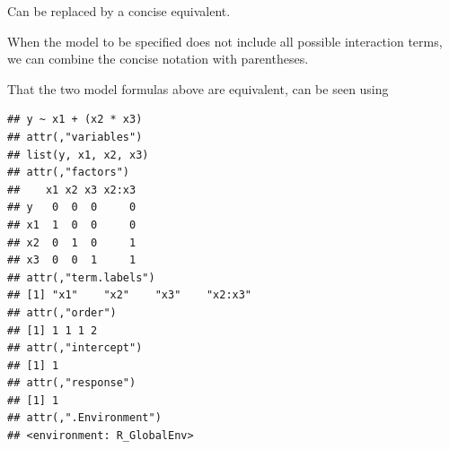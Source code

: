\documentclass[krantz2]{krantz}\usepackage{knitr}
\begin{document}
Can be replaced by a concise equivalent.

\begin{knitrout}\footnotesize
{}\color{fgcolor}\begin{kframe}
\begin{alltt}
 \hlopt{~}  \hlopt{*}  \hlopt{*} 
\end{alltt}
\end{kframe}
\end{knitrout}

When the model to be specified does not include all possible interaction terms, we can combine the concise notation with parentheses.

\begin{knitrout}\footnotesize
{}\color{fgcolor}\begin{kframe}
\begin{alltt}
 \hlopt{~}  \hlopt{+}  \hlopt{*} 
 \hlopt{~}  \hlopt{+}  \hlopt{+}  \hlopt{+} \hlopt{:}
\end{alltt}
\end{kframe}
\end{knitrout}

That the two model formulas above are equivalent, can be seen using 

\begin{knitrout}\footnotesize
{}\color{fgcolor}\begin{kframe}
\begin{alltt}
 \hlopt{~}  \hlopt{+}  \hlopt{*} 
\end{alltt}
\begin{verbatim}
## y ~ x1 + (x2 * x3)
## attr(,"variables")
## list(y, x1, x2, x3)
## attr(,"factors")
##    x1 x2 x3 x2:x3
## y   0  0  0     0
## x1  1  0  0     0
## x2  0  1  0     1
## x3  0  0  1     1
## attr(,"term.labels")
## [1] "x1"    "x2"    "x3"    "x2:x3"
## attr(,"order")
## [1] 1 1 1 2
## attr(,"intercept")
## [1] 1
## attr(,"response")
## [1] 1
## attr(,".Environment")
## <environment: R_GlobalEnv>
\end{verbatim}
\end{kframe}
\end{knitrout}

\begin{knitrout}\footnotesize
{}\color{fgcolor}\begin{kframe}
\begin{alltt}
 \hlopt{~}  \hlopt{*}  \hlopt{+} 
 \hlopt{~}  \hlopt{+}  \hlopt{+}  \hlopt{+} \hlopt{:} \hlopt{+} \hlopt{:}
\end{alltt}
\end{kframe}
\end{knitrout}
\end{document}
